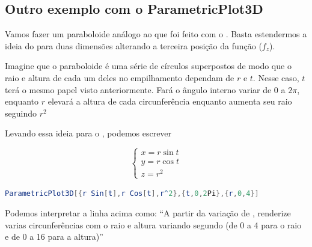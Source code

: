 \documentclass[a4paper, 12pt]{article}
\begin{document}
\newpage
\subsection{Outro exemplo com o ParametricPlot3D}

Vamos fazer um paraboloide análogo ao que foi feito com o . Basta estendermos a ideia do  para duas dimensões alterando a terceira posição da função ($f_{z}$). 

Imagine que o paraboloide é uma série de círculos superpostos de modo que o raio e altura de cada um deles no empilhamento dependam de $r$ e $t$. Nesse caso, $t$ terá o mesmo papel visto anteriormente. Fará o ângulo interno variar de 0 a $2\pi$, enquanto $r$ elevará a altura de cada circunferência enquanto aumenta seu raio seguindo $r^{2}$ 

Levando essa ideia para o , podemos escrever

$$
\begin{cases}
	x=r\sin t\\
	y=r\cos t\\
	z=r^{2}
\end{cases}
$$

\begin{lstlisting}[language=Mathematica]
ParametricPlot3D[{r Sin[t],r Cos[t],r^2},{t,0,2Pi},{r,0,4}]
\end{lstlisting}

Podemos interpretar a linha acima como: ``A partir da variação de , renderize varias circunferências com o raio e altura variando segundo  (de 0 a 4 para o raio e de 0 a 16 para a altura)''
\end{document}
